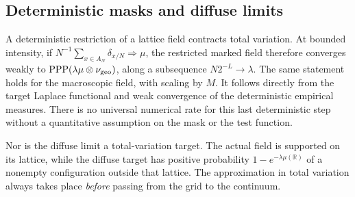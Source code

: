 \subsection{Deterministic masks and diffuse limits}
A deterministic restriction of a lattice field contracts total
variation. At bounded intensity, if
$N^{-1}\sum_{x\in A_N}\delta_{x/N}\Rightarrow\mu$, the restricted marked
field therefore converges weakly to
$\operatorname{PPP}(\lambda\mu\otimes\nu_{\rm geo})$, along a subsequence
$N2^{-L}\to\lambda$. The same statement holds for the macroscopic field,
with scaling by $M$. It follows directly from the target Laplace
functional and weak convergence of the deterministic empirical measures.
There is no universal numerical rate for this last deterministic step
without a quantitative assumption on the mask or the test function.

Nor is the diffuse limit a total-variation target. The actual field is
supported on its lattice, while the diffuse target has positive
probability $1-e^{-\lambda\mu(\mathbb R)}$ of a nonempty configuration
outside that lattice. The approximation in total variation always takes
place \emph{before} passing from the grid to the continuum.
